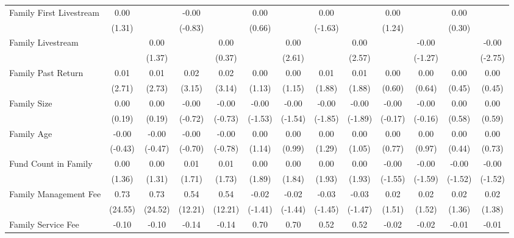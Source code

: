 \begin{landscape}
\begin{table}[!ht]
\begin{tabular}{l*{12}{c}}
            Family First Livestream & 0.00 &  & -0.00 &  & 0.00 &  & 0.00 &  & 0.00 &  & 0.00 &  \\
             & (1.31) &  & (-0.83) &  & (0.66) &  & (-1.63) &  & (1.24) &  & (0.30) &  \\
            [0.3em]
            Family Livestream &  & 0.00 &  & 0.00 &  & 0.00\sym{***} &  & 0.00\sym{**} &  & -0.00 &  & -0.00\sym{***} \\
             &  & (1.37) &  & (0.37) &  & (2.61) &  & (2.57) &  & (-1.27) &  & (-2.75) \\
            
            Family Past Return & 0.01\sym{***} & 0.01\sym{***} & 0.02\sym{***} & 0.02\sym{***} & 0.00 & 0.00 & 0.01\sym{*} & 0.01\sym{*} & 0.00 & 0.00 & 0.00 & 0.00 \\
             & (2.71) & (2.73) & (3.15) & (3.14) & (1.13) & (1.15) & (1.88) & (1.88) & (0.60) & (0.64) & (0.45) & (0.45) \\
            [0.3em]
            Family Size & 0.00 & 0.00 & -0.00 & -0.00 & -0.00 & -0.00 & -0.00\sym{*} & -0.00\sym{*} & -0.00 & -0.00 & 0.00 & 0.00 \\
             & (0.19) & (0.19) & (-0.72) & (-0.73) & (-1.53) & (-1.54) & (-1.85) & (-1.89) & (-0.17) & (-0.16) & (0.58) & (0.59) \\
            [0.3em]
            Family Age & -0.00 & -0.00 & -0.00 & -0.00 & 0.00 & 0.00 & 0.00 & 0.00 & 0.00 & 0.00 & 0.00 & 0.00 \\
             & (-0.43) & (-0.47) & (-0.70) & (-0.78) & (1.14) & (0.99) & (1.29) & (1.05) & (0.77) & (0.97) & (0.44) & (0.73) \\
            [0.3em]
            Fund Count in Family & 0.00 & 0.00 & 0.01\sym{*} & 0.01\sym{*} & 0.00\sym{*} & 0.00\sym{*} & 0.00\sym{*} & 0.00\sym{*} & -0.00 & -0.00 & -0.00 & -0.00 \\
             & (1.36) & (1.31) & (1.71) & (1.73) & (1.89) & (1.84) & (1.93) & (1.93) & (-1.55) & (-1.59) & (-1.52) & (-1.52) \\
            [0.3em]
            Family Management Fee & 0.73\sym{***} & 0.73\sym{***} & 0.54\sym{***} & 0.54\sym{***} & -0.02 & -0.02 & -0.03 & -0.03 & 0.02 & 0.02 & 0.02 & 0.02 \\
             & (24.55) & (24.52) & (12.21) & (12.21) & (-1.41) & (-1.44) & (-1.45) & (-1.47) & (1.51) & (1.52) & (1.36) & (1.38) \\
            [0.3em]
            Family Service Fee & -0.10\sym{*} & -0.10\sym{*} & -0.14\sym{*} & -0.14\sym{*} & 0.70\sym{***} & 0.70\sym{***} & 0.52\sym{***} & 0.52\sym{***} & -0.02 & -0.02 & -0.01 & -0.01 \\

\end{tabular}
\end{table}
\end{landscape}
